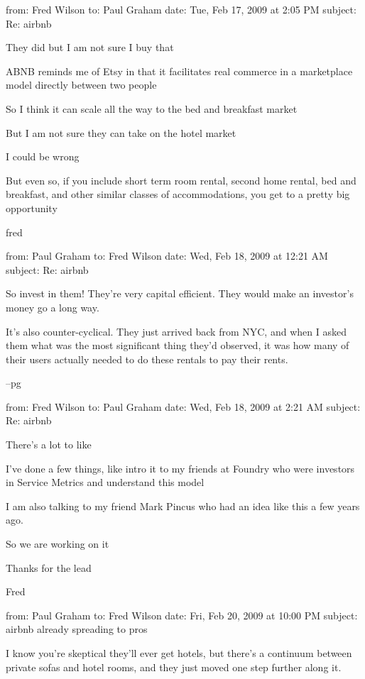 from: Fred Wilson
to: Paul Graham
date: Tue, Feb 17, 2009 at 2:05 PM
subject: Re: airbnb

They did but I am not sure I buy that

ABNB reminds me of Etsy in that it facilitates real commerce in a
marketplace model directly between two people

So I think it can scale all the way to the bed and breakfast market

But I am not sure they can take on the hotel market

I could be wrong

But even so, if you include short term room rental, second home
rental, bed and breakfast, and other similar classes of accommodations,
you get to a pretty big opportunity

fred



from: Paul Graham
to: Fred Wilson
date: Wed, Feb 18, 2009 at 12:21 AM
subject: Re: airbnb

So invest in them!  They're very capital efficient.  They would
make an investor's money go a long way.

It's also counter-cyclical.  They just arrived back from NYC, and
when I asked them what was the most significant thing they'd observed,
it was how many of their users actually needed to do these rentals
to pay their rents.

--pg



from: Fred Wilson
to: Paul Graham
date: Wed, Feb 18, 2009 at 2:21 AM
subject: Re: airbnb

There's a lot to like

I've done a few things, like intro it to my friends at Foundry who
were investors in Service Metrics and understand this model

I am also talking to my friend Mark Pincus who had an idea like
this a few years ago.

So we are working on it

Thanks for the lead

Fred



from: Paul Graham
to: Fred Wilson
date: Fri, Feb 20, 2009 at 10:00 PM
subject: airbnb already spreading to pros

I know you're skeptical they'll ever get hotels, but there's a
continuum between private sofas and hotel rooms, and they just moved
one step further along it.

